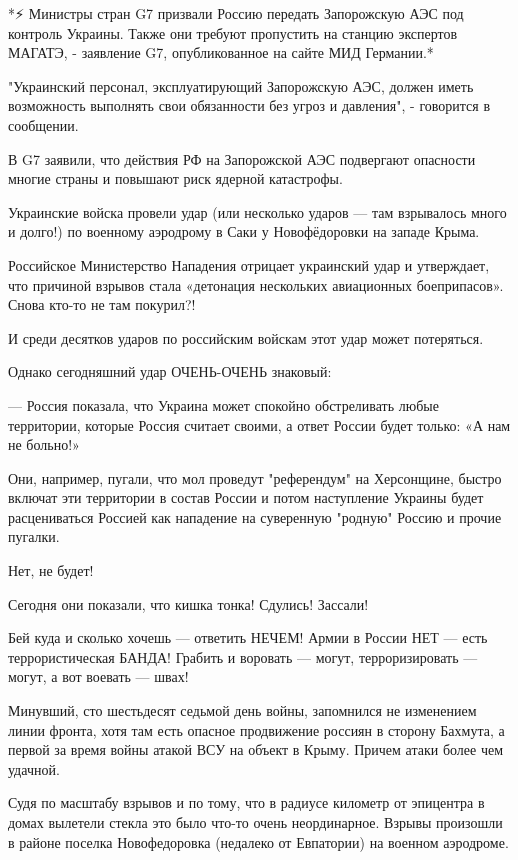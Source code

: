 {%

*⚡️ Министры стран G7 призвали Россию передать Запорожскую АЭС под контроль
Украины. Также они требуют пропустить на станцию экспертов МАГАТЭ, - заявление
G7, опубликованное на сайте МИД Германии.*

"Украинский персонал, эксплуатирующий Запорожскую АЭС, должен иметь возможность
выполнять свои обязанности без угроз и давления", - говорится в сообщении.

В G7 заявили, что действия РФ на Запорожской АЭС подвергают опасности многие
страны и повышают риск ядерной катастрофы.


Украинские войска провели удар (или несколько ударов — там взрывалось много и
долго!) по военному аэродрому в Саки у Новофёдоровки на западе Крыма.

Российское Министерство Нападения отрицает украинский удар и утверждает, что
причиной взрывов стала «детонация нескольких авиационных боеприпасов». Снова
кто-то не там покурил?!

И среди десятков ударов по российским войскам этот удар может потеряться.

Однако сегодняшний удар ОЧЕНЬ-ОЧЕНЬ знаковый:

— Россия показала, что Украина может спокойно обстреливать любые территории,
которые Россия считает своими, а ответ России будет только: «А нам не больно!»

Они, например, пугали, что мол проведут "референдум" на Херсонщине, быстро
включат эти территории в состав России и потом наступление Украины будет
расцениваться Россией как нападение на суверенную "родную" Россию и прочие
пугалки.

Нет, не будет!

Сегодня они показали, что кишка тонка! Сдулись! Зассали!

Бей куда и сколько хочешь — ответить НЕЧЕМ! Армии в России НЕТ — есть
террористическая БАНДА! Грабить и воровать — могут, терроризировать — могут, а
вот воевать — швах!


Минувший, сто шестьдесят седьмой день войны, запомнился не изменением линии
фронта, хотя там есть опасное продвижение россиян в сторону Бахмута, а первой
за время войны атакой ВСУ на объект в Крыму. Причем атаки более чем удачной.

Судя по масштабу взрывов и по тому, что в радиусе километр от эпицентра в домах
вылетели стекла это было что-то очень неординарное. Взрывы произошли в районе
поселка Новофедоровка (недалеко от Евпатории) на военном аэродроме.

}
